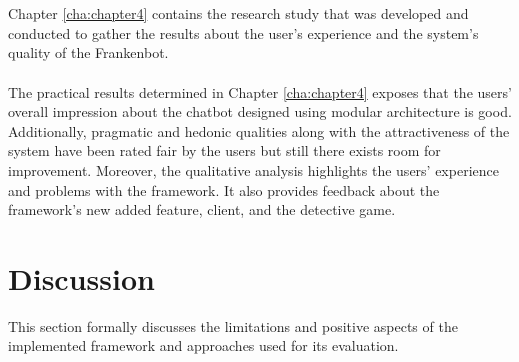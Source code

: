 \\~\\
Chapter \ref{cha:chapter4} contains the research study that was developed and conducted to gather the results about the user's experience and the system's quality of the Frankenbot.
\\~\\
The practical results determined in Chapter \ref{cha:chapter4} exposes that the users' overall impression about the chatbot designed using modular architecture is good. Additionally, pragmatic and hedonic qualities along with the attractiveness of the system have been rated fair by the users but still there exists room for improvement. Moreover, the qualitative analysis highlights the users' experience and problems with the framework. It also provides feedback about the framework's new added feature, client, and the detective game.

\section{Discussion\label{sec:discussion}}
This section formally discusses the limitations and positive aspects of the implemented framework and approaches used for its evaluation. 

